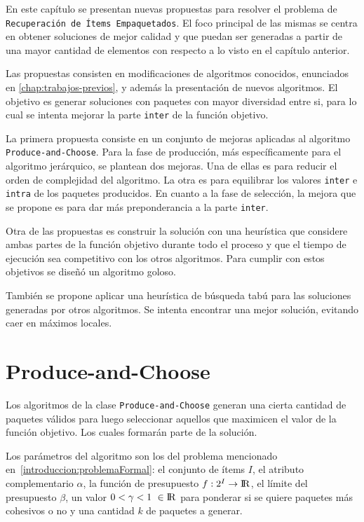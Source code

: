 En este capítulo se presentan nuevas propuestas para resolver el problema de \texttt{\\Recuperación de Ítems Empaquetados}. El foco principal de las mismas se centra en obtener soluciones de mejor calidad y que puedan ser generadas a partir de una mayor cantidad de elementos con respecto a lo visto en el capítulo anterior. 

Las propuestas consisten en modificaciones de algoritmos conocidos, enunciados en \autoref{chap:trabajos-previos}, y además la presentación de nuevos algoritmos. El objetivo es generar soluciones con paquetes con mayor diversidad entre si, para lo cual se intenta mejorar la parte \texttt{inter} de la función objetivo.

La primera propuesta consiste en un conjunto de mejoras aplicadas al algoritmo \allowbreak \texttt{Produce\allowbreak-and\allowbreak-Choose}. Para la fase de producción, más específicamente para el algoritmo jerárquico, se plantean dos mejoras. Una de ellas es para reducir el orden de complejidad del algoritmo. La otra es para equilibrar los valores \texttt{inter} e \texttt{intra} de los paquetes producidos. En cuanto a la fase de selección, la mejora que se propone es para dar más preponderancia a la parte \texttt{inter}.

Otra de las propuestas es construir la solución con una heurística que considere ambas partes de la función objetivo durante todo el proceso y que el tiempo de ejecución sea competitivo con los otros algoritmos. Para cumplir con estos objetivos se diseñó un algoritmo goloso.

También se propone aplicar una heurística de búsqueda tabú para las soluciones generadas por otros algoritmos. Se intenta encontrar una mejor solución, evitando caer en máximos locales. 

\section{Produce-and-Choose}
Los algoritmos de la clase \texttt{Produce\allowbreak-and\allowbreak-Choose} generan una cierta cantidad de paquetes válidos para luego seleccionar aquellos que maximicen el valor de la función objetivo. Los cuales formarán parte de la solución.

Los parámetros del algoritmo son los del problema mencionado en~\autoref{introduccion:problemaFormal}: el conjunto de ítems $I$, el atributo complementario $\alpha$, la función de presupuesto $f: 2^{I} \rightarrow \rm I \!R$, el límite del presupuesto $\beta$, un valor $0 < \gamma < 1\ \in \rm I \!R$ para ponderar si se quiere paquetes más cohesivos o no y una cantidad $k$ de paquetes a generar. 

